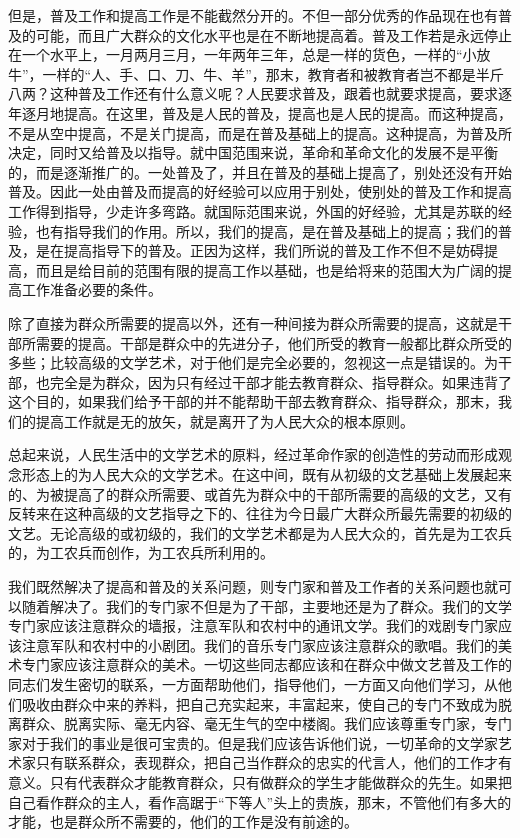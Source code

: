 但是，普及工作和提高工作是不能截然分开的。不但一部分优秀的作品现在也有普及的可能，而且广大群众的文化水平也是在不断地提高着。普及工作若是永远停止在一个水平上，一月两月三月，一年两年三年，总是一样的货色，一样的“小放牛”，一样的“人、手、口、刀、牛、羊”，那末，教育者和被教育者岂不都是半斤八两？这种普及工作还有什么意义呢？人民要求普及，跟着也就要求提高，要求逐年逐月地提高。在这里，普及是人民的普及，提高也是人民的提高。而这种提高，不是从空中提高，不是关门提高，而是在普及基础上的提高。这种提高，为普及所决定，同时又给普及以指导。就中国范围来说，革命和革命文化的发展不是平衡的，而是逐渐推广的。一处普及了，并且在普及的基础上提高了，别处还没有开始普及。因此一处由普及而提高的好经验可以应用于别处，使别处的普及工作和提高工作得到指导，少走许多弯路。就国际范围来说，外国的好经验，尤其是苏联的经验，也有指导我们的作用。所以，我们的提高，是在普及基础上的提高；我们的普及，是在提高指导下的普及。正因为这样，我们所说的普及工作不但不是妨碍提高，而且是给目前的范围有限的提高工作以基础，也是给将来的范围大为广阔的提高工作准备必要的条件。

除了直接为群众所需要的提高以外，还有一种间接为群众所需要的提高，这就是干部所需要的提高。干部是群众中的先进分子，他们所受的教育一般都比群众所受的多些；比较高级的文学艺术，对于他们是完全必要的，忽视这一点是错误的。为干部，也完全是为群众，因为只有经过干部才能去教育群众、指导群众。如果违背了这个目的，如果我们给予干部的并不能帮助干部去教育群众、指导群众，那末，我们的提高工作就是无的放矢，就是离开了为人民大众的根本原则。

总起来说，人民生活中的文学艺术的原料，经过革命作家的创造性的劳动而形成观念形态上的为人民大众的文学艺术。在这中间，既有从初级的文艺基础上发展起来的、为被提高了的群众所需要、或首先为群众中的干部所需要的高级的文艺，又有反转来在这种高级的文艺指导之下的、往往为今日最广大群众所最先需要的初级的文艺。无论高级的或初级的，我们的文学艺术都是为人民大众的，首先是为工农兵的，为工农兵而创作，为工农兵所利用的。

我们既然解决了提高和普及的关系问题，则专门家和普及工作者的关系问题也就可以随着解决了。我们的专门家不但是为了干部，主要地还是为了群众。我们的文学专门家应该注意群众的墙报，注意军队和农村中的通讯文学。我们的戏剧专门家应该注意军队和农村中的小剧团。我们的音乐专门家应该注意群众的歌唱。我们的美术专门家应该注意群众的美术。一切这些同志都应该和在群众中做文艺普及工作的同志们发生密切的联系，一方面帮助他们，指导他们，一方面又向他们学习，从他们吸收由群众中来的养料，把自己充实起来，丰富起来，使自己的专门不致成为脱离群众、脱离实际、毫无内容、毫无生气的空中楼阁。我们应该尊重专门家，专门家对于我们的事业是很可宝贵的。但是我们应该告诉他们说，一切革命的文学家艺术家只有联系群众，表现群众，把自己当作群众的忠实的代言人，他们的工作才有意义。只有代表群众才能教育群众，只有做群众的学生才能做群众的先生。如果把自己看作群众的主人，看作高踞于“下等人”头上的贵族，那末，不管他们有多大的才能，也是群众所不需要的，他们的工作是没有前途的。

